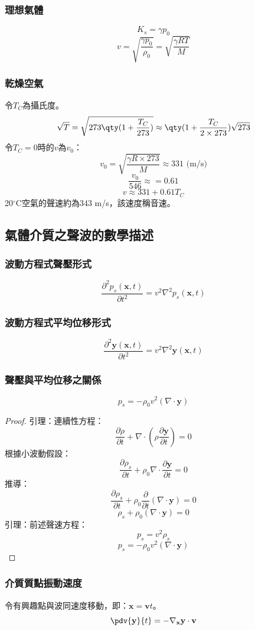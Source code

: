 \documentclass[a4paper,12pt]{report}
\begin{document}
\subsubsection {理想氣體}
\[K_s=\gamma p_0\]
\[v = \sqrt{\frac{\gamma p_0}{\rho_0}} = \sqrt{\frac{\gamma RT}{M}}\]
\subsubsection {乾燥空氣}
令$T_C$為攝氏度。
\[\sqrt{T}=\sqrt{273\qty(1+\frac{T_C}{273})}\approx \qty(1+\frac{T_C}{2\times 273})\sqrt{273}\]
令$T_C=0$時的$v$為$v_0$：
\[v_0=\sqrt{\frac{\gamma R\times 273}{M}}\approx 331 \text{ (m/s)}\]
\[\frac{v_0}{546}\approx =0.61\]
\[v\approx 331+0.61T_C\]
20$^\circ$C空氣的聲速約為343 m/s，該速度稱音速。
\subsection {氣體介質之聲波的數學描述}
\subsubsection {波動方程式聲壓形式}
\[\frac{\partial^2 p_s(\mathbf{x}, t)}{\partial t^2} = v^2 \nabla^2 p_s(\mathbf{x}, t)\]
\subsubsection {波動方程式平均位移形式}
\[\frac{\partial^2 \mathbf{y}(\mathbf{x}, t)}{\partial t^2} = v^2 \nabla^2 \mathbf{y}(\mathbf{x}, t)\]
\subsubsection {聲壓與平均位移之關係}
\[p_s = -\rho_0 v^2 (\nabla \cdot \mathbf{y})\]
\begin{proof}
引理：連續性方程：
\[\frac{\partial \rho}{\partial t} + \nabla \cdot \left( \rho \frac{\partial\mathbf{y}}{\partial t} \right) = 0\]
根據小波動假設：
\[\frac{\partial \rho_s}{\partial t} + \rho_0 \nabla \cdot \frac{\partial\mathbf{y}}{\partial t} = 0\]
推導：
\[\frac{\partial \rho_s}{\partial t} + \rho_0 \frac{\partial}{\partial t} (\nabla \cdot \mathbf{y}) = 0\]
\[\rho_s + \rho_0 (\nabla \cdot \mathbf{y}) = 0\]
引理：前述聲速方程：
\[p_s = v^2 \rho_s\]
\[p_s = -\rho_0 v^2 (\nabla \cdot \mathbf{y})\]
\end{proof}
\subsubsection{介質質點振動速度}
令有興趣點與波同速度移動，即：$\mathbf{x}=\mathbf{v}t$。
\[\pdv{\mathbf{y}}{t} = - \nabla_{\mathbf{x}} \mathbf{y} \cdot \mathbf{v}\]
\end{document}
